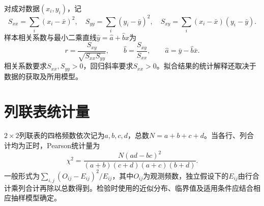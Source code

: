 对成对数据\((x_i,y_i)\)，记
\begin{equation*}
 S_{xx}=\sum_i(x_i-\bar x)^2,\quad
 S_{yy}=\sum_i(y_i-\bar y)^2,\quad
 S_{xy}=\sum_i(x_i-\bar x)(y_i-\bar y).
\end{equation*}
样本相关系数与最小二乘直线\(\widehat y=\widehat a+\widehat b x\)为
\begin{equation*}
 r=\frac{S_{xy}}{\sqrt{S_{xx}S_{yy}}},\qquad
 \widehat b=\frac{S_{xy}}{S_{xx}},\qquad
 \widehat a=\bar y-\widehat b\bar x.
\end{equation*}
相关系数要求\(S_{xx},S_{yy}>0\)，回归斜率要求\(S_{xx}>0\)。拟合结果的统计解释还取决于数据的获取及所用模型。

\section{列联表统计量}

\(2\times2\)列联表的四格频数依次记为\(a,b,c,d\)，总数\(N=a+b+c+d\)。当各行、列合计均为正时，Pearson统计量为
\begin{equation*}
 \chi^2=\frac{N(ad-bc)^2}{(a+b)(c+d)(a+c)(b+d)}.
\end{equation*}
一般形式为\(\sum_{i,j}(O_{ij}-E_{ij})^2/E_{ij}\)，其中\(O_{ij}\)为观测频数，独立假设下的\(E_{ij}\)由行合计乘列合计再除以总数得到。检验时使用的近似分布、临界值及适用条件应结合相应抽样模型确定。
